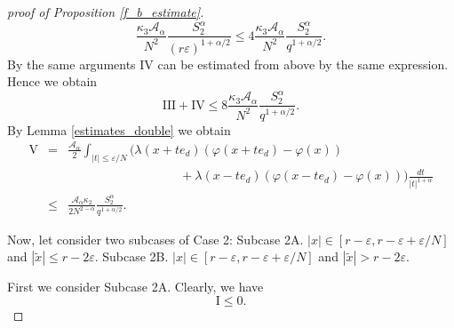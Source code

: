 \documentclass[a4paper,12pt,reqno]{amsart}
\theoremstyle{definition}
\theoremstyle{remark}
\newcommand{\eps}{\varepsilon}
\newcommand{\calA}{\mathcal{A}}
\begin{document}
\begin{proof}[proof of Proposition \ref{f_b_estimate}]
$$
\frac{\kappa_3 \calA_{\alpha} }{N^2} \frac{S^{\alpha}_2}{(r \eps)^{1 + \alpha/2}}\le 4\frac{\kappa_3 \calA_{\alpha} }{N^2} \frac{S^{\alpha}_2}{q^{1 + \alpha/2}}.
$$
By the same arguments $\text{IV}$ can be estimated from above by the same expression. Hence we obtain
\begin{equation}
\label{Case_2_V_VI}
\text{III} + \text{IV} \le 8\frac{\kappa_3 \calA_{\alpha} }{N^2} \frac{S^{\alpha}_2}{q^{1 + \alpha/2}}.
\end{equation}
By Lemma \ref{estimates_double} we obtain
\begin{eqnarray}
\nonumber
\text{V}
&=&
\frac{\calA_{\alpha} }{2} \int_{|t| \le \eps/N}
\Big( \lambda(x + t e_d) (\varphi(x + t e_d) - \varphi(x)) \\
\nonumber
&& \quad \quad \quad \quad \quad \quad \quad \quad \quad +   \lambda(x - t e_d) (\varphi(x - t e_d) - \varphi(x)) \Big) \frac{dt}{|t|^{1+\alpha}}  
\\
\label{Case_2_VII_1}
&\le& \frac{\calA_{\alpha}  \kappa_2}{2 N^{2 - \alpha}}  \frac{S_2^\alpha}{q^{1+\alpha/2}}.
\end{eqnarray}

Now, let consider two subcases of Case 2:
Subcase 2A. $|x| \in [r -\eps, r - \eps + \eps/N]$ and $|\tilde{x}| \le r - 2 \eps$.
Subcase 2B. $|x| \in [r -\eps, r - \eps + \eps/N]$ and $|\tilde{x}| > r - 2 \eps$.

First we consider Subcase 2A. 
Clearly, we have 
\begin{equation}
\label{Case_2A_I}
\text{I} \le 0.
\end{equation} 


\end{proof}
\end{document}
